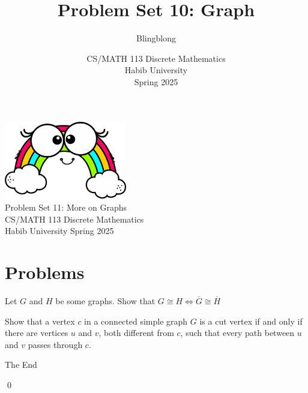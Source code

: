 \documentclass[a4paper]{exam}
\title{Problem Set 10: Graph}
\author{Blingblong} %
\date{CS/MATH 113 Discrete Mathematics\\Habib University\\Spring 2025}
\theoremstyle{claim}
\begin{document}
\color{purple}

\begin{center}
  \includegraphics[width=0.4\textwidth]{Rainbow.png}\\
  \huge{Problem Set 11: More on Graphs}\\

  \Large{CS/MATH 113 Discrete Mathematics}\\
  \Large{Habib University Spring 2025}
\end{center}
\section*{Problems}

\begin{questions}
  \question Let $G$ and $H$ be some graphs. Show that $G \cong H \iff \overline{G} \cong \overline{H}$
  \begin{solution}
  \end{solution}

   \question Show that a vertex $c$ in a connected simple graph $G$ is a cut vertex if and only if there are vertices $u$ and $v$, both different from $c$, such that every path between $u$ and $v$ passes through $c$.
   \begin{solution}
  \end{solution}
\end{questions}

\begin{center}
  The End

  \qed
\end{center}
\end{document}
